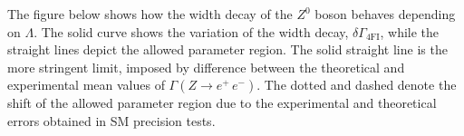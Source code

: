 \documentclass[twocolumn,showpacs,showkeys,prd,superscriptaddress]{revtex4-1}
\begin{document}
The figure below shows how the width decay of the $Z^0$ boson behaves depending on $\Lambda$. %
The solid curve shows the variation of the width decay, $\delta\Gamma_{\text{4FI}}$, while the straight lines depict the allowed parameter region. The solid straight line is the more stringent limit, imposed by difference between the theoretical and experimental mean values of \mbox{$\Gamma(Z\to e^+\,e^-)$}. The dotted and dashed denote the shift of the allowed parameter region due to the experimental and theoretical errors obtained in SM precision tests.
\vspace{0.4cm}
\end{document}
